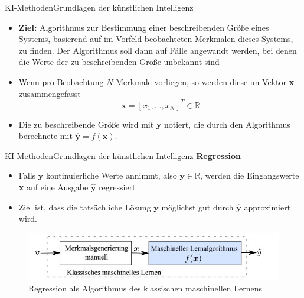 \documentclass[169, handout	]{THIbeamer} %
\begin{document}
	\begin{frame}{KI-Methoden}{Grundlagen der künstlichen Intelligenz}
		\begin{itemize}
			\item \textbf{Ziel:} Algorithmus zur Bestimmung einer beschreibenden Größe eines Systems, basierend auf im Vorfeld beobachteten Merkmalen dieses Systems, zu finden. Der Algorithmus soll dann auf Fälle angewandt werden, bei denen die Werte der zu beschreibenden Größe unbekannt sind
			\item Wenn pro Beobachtung $N$ Merkmale vorliegen, so werden diese im Vektor \textbf{x} zusammengefasst
			\begin{equation}
				\textbf{x} = [x_1,..., x_{N}]^{T} \in \mathbb{R}
			\end{equation}
			\item Die zu beschreibende Größe wird mit \textbf{y} notiert, die durch den Algorithmus berechnete mit $\hat{\textbf{y}} = f(\textbf{x})$.
		\end{itemize}	
	\end{frame}
	\begin{frame}{KI-Methoden}{Grundlagen der künstlichen Intelligenz}
		\textbf{Regression}	
		\begin{itemize}
			\item Falls $\textbf{y}$ kontinuierliche Werte annimmt, also $\textbf{y} \in \mathbb{R}$, werden die Eingangswerte \textbf{x} auf eine Ausgabe $\hat{\textbf{y}}$ regressiert 
			\item Ziel ist, dass die tatsächliche Lösung $\textbf{y}$ möglichst gut durch $\hat{\textbf{y}} $ approximiert wird.
		\end{itemize}			
		\begin{figure}
			\includegraphics[scale=0.7]{required/Machine Learning.jpg}
			\caption{Regression als Algorithmus des klassischen maschinellen Lernens}
        	\label{Machine Learning}
		\end{figure}
	\end{frame}
\end{document}
